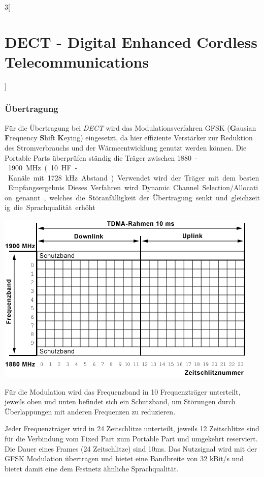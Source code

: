 \begin{multicols}{3}[\section{DECT - Digital Enhanced Cordless Telecommunications}]
\subsubsection*{Übertragung}
Für die Übertragung bei \textit{DECT} wird das Modulationsverfahren GFSK (\textbf{G}ausian \textbf{F}requency \textbf{S}hift \textbf{K}eying) eingesetzt, da hier effiziente Verstärker zur Reduktion des Stromverbrauchs und der Wärmeentwicklung genutzt werden können.
Die Portable Parts überprüfen ständig die Träger zwischen \SI{1880}-\SI{1900}{\mega\hertz} (10 HF-Kanäle mit \SI{1728}{\kilo\hertz} Abstand). Verwendet wird der Träger mit dem besten Empfangsergebnis. Dieses Verfahren wird Dynamic Channel Selection/Allocation genannt, welches die Störanfälligkeit der Übertragung senkt und gleichzeitig die Sprachqualität erhöht. \cite{dect.1}

\begin{Figure}
\includegraphics[width=\linewidth]{Kapitel/DECT/Grafiken/frequenzband.png}
\label{fig:dect.frequenzband}
\end{Figure}
Für die Modulation wird das Frequenzband in 10 Frequenzträger unterteilt, jeweils oben und unten befindet sich ein Schutzband, um Störungen durch Überlappungen mit anderen Frequenzen zu reduzieren. 

Jeder Frequenzträger wird in 24 Zeitschlitze unterteilt, jeweils 12 Zeitschlitze sind für die Verbindung vom Fixed Part zum Portable Part und umgekehrt reserviert. Die Dauer eines Frames (24 Zeitschlitze) sind 10ms.
Das Nutzsignal wird mit der GFSK Modulation übertragen und bietet eine Bandbreite von 32 kBit/s und bietet damit eine dem Festnetz ähnliche Sprachqualität.


\end{multicols}

